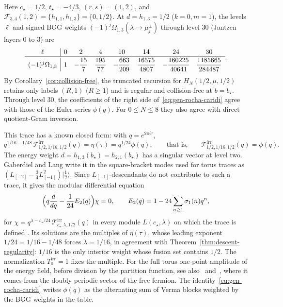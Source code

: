 \documentclass[twoside,10pt]{article}
\numberwithin{equation}{section}
\theoremstyle{slbody}
\theoremstyle{definition}
\theoremstyle{remark}
\begin{document}
Here \(c_\star=1/2\), \(t_\star=-4/3\), \((r,s)=(1,2)\), and
\(\mathcal{F}_{3,4}(1,2)=\{h_{1,1},h_{1,3}\}=\{0,1/2\}\).  At \(d=h_{1,3}=1/2\)
(\(k=0,m=1\)), the levels \(\ell\) and signed BGG weights
\((-1)^j\Omega_{1,3}(\lambda\to\mu^\pm_j)\) through level \(30\) (Jantzen
layers \(0\) to \(3\)) are
\[
 \begin{array}{c|ccccccc}
  \ell & 0 & 2 & 4 & 10 & 14 & 24 & 30 \\\hline\noalign{\vskip2pt}
  (-1)^j\Omega_{1,3} & 1 & -\dfrac{15}{7} & \dfrac{195}{77} & -\dfrac{663}{209} & \dfrac{16575}{4807} & -\dfrac{160225}{40641} & \dfrac{1185665}{284487}
 \end{array}.
\]
By Corollary~\ref{cor:collision-free}, the truncated recursion for
\(H_N(1/2,\mu,1/2)\) retains only labels \((R,1)\) (\(R\geq1\)) and is
regular and collision-free at \(b=b_\star\).  Through level \(30\), the
coefficients of the right side of~\eqref{eq:gen-rocha-caridi} agree with those
of the Euler series \(\phi(q)\).  For \(0\leq N\leq 8\) they also agree with
direct quotient-Gram inversion.

This trace has a known closed form: with \(q=e^{2\pi i\tau}\),
\[
 q^{1/16-1/48}\,\mathcal{T}^{\mathrm{irr}}_{1/2,1/16,1/2}(q)=\eta(\tau)
 =q^{1/24}\phi(q),
 \qquad\text{that is,}\qquad
 \mathcal{T}^{\mathrm{irr}}_{1/2,1/16,1/2}(q)=\phi(q).
\]
The energy weight \(d=h_{1,3}(b_\star)=h_{2,1}(b_\star)\) has a singular
vector at level two.  Gaberdiel and Lang write it in the square-bracket modes
used for torus traces as
\((L_{[-2]}-\tfrac34L_{[-1]}^2)\lvert\tfrac12\rangle\).  Since
\(L_{[-1]}\)-descendants do not contribute to such a trace, it gives the
modular differential equation
\[
 \Bigl(q\frac{d}{dq}-\frac{1}{24}E_2(q)\Bigr)\chi=0,
 \qquad E_2(q)=1-24\sum_{n\geq1}\sigma_1(n)q^n,
\]
for \(\chi=q^{\lambda-c_\star/24}\,\mathcal{T}^{\mathrm{irr}}_{c_\star,\lambda,1/2}(q)\)
in every module \(L(c_\star,\lambda)\) on which the trace is defined
\cite[\S2 and \S3.1.2, (3.11)--(3.15)]{GaberdielLang2009}.  Its solutions are
the multiples of \(\eta(\tau)\), whose leading exponent
\(1/24=1/16-1/48\) forces \(\lambda=1/16\), in agreement with
Theorem~\ref{thm:descent-regularity}: \(1/16\) is the only interior weight
whose fusion set contains \(1/2\).  The normalization
\(T^{\mathrm{irr}}_0=1\) fixes the multiple.  For the full torus one-point
amplitude of the energy field, before division by the partition function, see
also~\cite[\S4.2.4, (4.53)--(4.61)]{BrehmRunkel2022}
and~\cite[\S3.2, (3.13)]{DiFrancescoSaleurZuber1987}, where it comes from the
doubly periodic sector of the free fermion.  The
identity~\eqref{eq:gen-rocha-caridi} writes \(\phi(q)\) as the alternating sum
of Verma blocks weighted by the BGG weights in the table.
\end{document}
